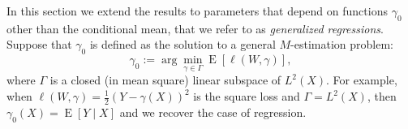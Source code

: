 \documentclass[aos]{imsart}
\numberwithin{equation}{section}
\theoremstyle{plain}
\theoremstyle{remark}
\DeclareMathOperator{\E}{E}
\begin{document}

In this section we extend the results to parameters that depend on
functions $\gamma_{0}$ other than the conditional mean, that we refer to as
\textit{generalized regressions}. Suppose that $\gamma_0$ is defined as the solution to a general $M$-estimation problem:
\begin{equation}
  \gamma_0 := \arg\min_{\gamma \in \Gamma} \E[\ell(W, \gamma)], \label{eq:M-est}  
\end{equation}
where $\Gamma$ is a closed (in mean square) linear subspace of $L^2(X)$. For example, when $\ell(W, \gamma) = \frac{1}{2} (Y - \gamma(X))^2$ is the square loss and $\Gamma = L^2(X)$, then $\gamma_0(X) = \E[Y \mid X]$ and we recover the case of regression. 
\end{document}
